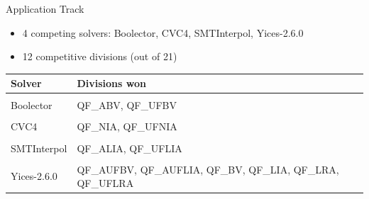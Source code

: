 \documentclass{beamer}
\begin{document}

\begin{frame}{Application Track}
  \begin{itemize}
  \item 4 competing solvers: Boolector, CVC4, SMTInterpol, Yices-2.6.0
  \item 12 competitive divisions (out of 21)
  \end{itemize}

  \bigskip

  \begin{center}
    \begin{tabular}{lp{}}
      Solver      & Divisions won \\ \hline \\[-1.5ex]
      Boolector   & QF\_ABV, QF\_UFBV\\
      \\[-1.5ex]
      CVC4        & QF\_NIA, QF\_UFNIA\\
      \\[-1.5ex]
      SMTInterpol & QF\_ALIA, QF\_UFLIA\\
      \\[-1.5ex]
      Yices-2.6.0 & QF\_AUFBV, QF\_AUFLIA, QF\_BV, QF\_LIA, QF\_LRA, QF\_UFLRA\\
    \end{tabular}
  \end{center}

  \vspace{-1.6cm}

  \pause
  
\end{frame}

\end{document}

